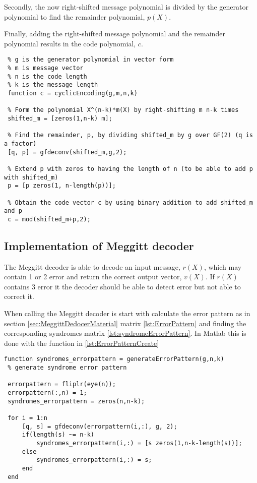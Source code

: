 \documentclass[Main]{subfiles}
\begin{document}
Secondly, the now right-shifted message polynomial is divided by the generator polynomial to find the remainder polynomial, $p(X)$.

Finally, adding the right-shifted message polynomial and the remainder polynomial results in the code polynomial, $c$.  

\begin{lstlisting}[caption=Cyclic Encoder, style=Code-Matlab, label=lst:refID]
 % cyclicEncoding is a function that encodes a message vector into systematic code given the following parameters
 % g is the generator polynomial in vector form
 % m is message vector
 % n is the code length
 % k is the message length
 function c = cyclicEncoding(g,m,n,k)

 % Form the polynomial X^(n-k)*m(X) by right-shifting m n-k times 
 shifted_m = [zeros(1,n-k) m];

 % Find the remainder, p, by dividing shifted_m by g over GF(2) (q is a factor)
 [q, p] = gfdeconv(shifted_m,g,2);

 % Extend p with zeros to having the length of n (to be able to add p with shifted_m)
 p = [p zeros(1, n-length(p))];

 % Obtain the code vector c by using binary addition to add shifted_m and p 
 c = mod(shifted_m+p,2);
\end{lstlisting}

\subsection{Implementation of Meggitt decoder}
\label{sec:ImplementMeggittDecoder}
The Meggitt decoder is able to decode an input message, $r(X)$, which may contain 1 or 2 error and return the correct output vector, $v(X)$.
If $r(X)$ contains 3 error it the decoder should be able to detect error but not able to correct it.

When calling the Meggitt decoder is start with calculate the error pattern as in section \ref{sec:MeggittDedocerMaterial} matrix \ref{lst:ErrorPattern} and finding the corresponding syndromes matrix \ref{lst:syndromeErrorPattern}.
In Matlab this is done with the function in \codeTitle \ref{lst:ErrorPatternCreate}

\begin{lstlisting}[caption=Error pattern creation, style=Code-Matlab, label=lst:ErrorPatternCreate]
 function syndromes_errorpattern = generateErrorPattern(g,n,k)
 % generate syndrome error pattern
 
 errorpattern = fliplr(eye(n));
 errorpattern(:,n) = 1;
 syndromes_errorpattern = zeros(n,n-k);
 
 for i = 1:n
     [q, s] = gfdeconv(errorpattern(i,:), g, 2);
     if(length(s) ~= n-k)
         syndromes_errorpattern(i,:) = [s zeros(1,n-k-length(s))];
     else
         syndromes_errorpattern(i,:) = s;
     end
 end
\end{lstlisting}
\end{document}
